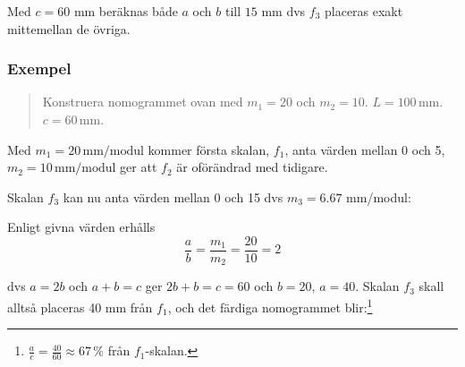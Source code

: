 \documentclass[oneside,11pt,a4paper,swedish]{scrbook}
\newcommand{\startex}[1]{\subsubsection{Exempel}\begin{quote}#1\end{quote}}
\begin{document}
Med $c=60$ mm beräknas både $a$ och $b$ till $15$ mm dvs $f_3$ placeras exakt mittemellan de övriga. 


\startex {Konstruera nomogrammet ovan med $m_1=20$ och $m_2=10$. $L=100\,\textrm{mm}$. $c=60\,\textrm{mm}$.}

Med $m_1=20\, \textrm{mm/modul}$ kommer första skalan, $f_1$, anta värden mellan 0 och 5, $m_2=10\, \textrm{mm/modul}$ ger att $f_2$ är oförändrad med tidigare.



Skalan $f_3$ kan nu anta värden mellan 0 och 15 dvs $m_3=6.67$ mm/modul:


Enligt givna värden erhålls
\[ \frac{a}{b}= \frac{m_1}{m_2}=\frac{20}{10}= 2\]

dvs $a=2b$ och  $a+b=c$ ger $2b+b=c=60$ och  $b=20$, $a=40$. Skalan $f_3$ skall alltså placeras 40 mm från $f_1$, och det färdiga nomogrammet blir:\footnote{$\frac{a}{c}=\frac{40}{60}\approx 67\,\% $ från $f_1$-skalan.}
\end{document}
